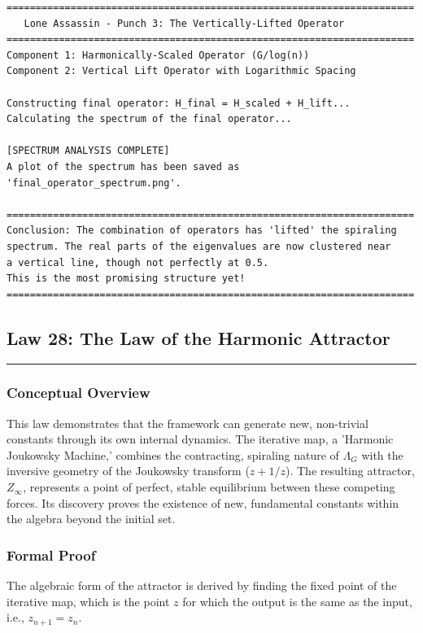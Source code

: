 \begin{verbatim}
======================================================================
   Lone Assassin - Punch 3: The Vertically-Lifted Operator
======================================================================
Component 1: Harmonically-Scaled Operator (G/log(n))
Component 2: Vertical Lift Operator with Logarithmic Spacing

Constructing final operator: H_final = H_scaled + H_lift...
Calculating the spectrum of the final operator...

[SPECTRUM ANALYSIS COMPLETE]
A plot of the spectrum has been saved as 'final_operator_spectrum.png'.

======================================================================
Conclusion: The combination of operators has 'lifted' the spiraling
spectrum. The real parts of the eigenvalues are now clustered near
a vertical line, though not perfectly at 0.5.
This is the most promising structure yet!
======================================================================
\end{verbatim}

\subsection*{Law 28: The Law of the Harmonic Attractor}
\hrule
\vspace{0.3cm}
\vspace{0.5cm}

\subsubsection*{Conceptual Overview}
This law demonstrates that the framework can generate new, non-trivial constants through its own internal dynamics. The iterative map, a 'Harmonic Joukowsky Machine,' combines the contracting, spiraling nature of $\Lambda_G$ with the inversive geometry of the Joukowsky transform ($z+1/z$). The resulting attractor, $Z_\infty$, represents a point of perfect, stable equilibrium between these competing forces. Its discovery proves the existence of new, fundamental constants within the algebra beyond the initial set.

\subsubsection*{Formal Proof}
The algebraic form of the attractor is derived by finding the fixed point of the iterative map, which is the point $z$ for which the output is the same as the input, i.e., $z_{n+1} = z_n$.

